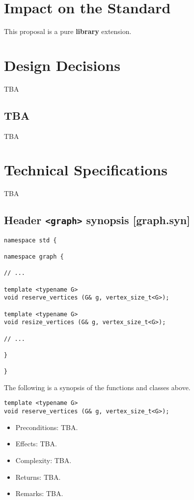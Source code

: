 \documentclass[10pt,onecolumn]{article}
\begin{document}
\section{Impact on the Standard}
This proposal is a pure \textbf{library} extension.

\section{Design Decisions}
TBA

\subsection{TBA}
TBA

\section{Technical Specifications}
TBA

\subsection{Header \texttt{<graph>} synopsis [graph.syn]}

\begin{lstlisting}
namespace std {

namespace graph {

// ...

template <typename G>
void reserve_vertices (G& g, vertex_size_t<G>);

template <typename G>
void resize_vertices (G& g, vertex_size_t<G>);

// ...

}

}
\end{lstlisting}

\vspace{10pt}

\noindent The following is a synopsis of the functions and classes above.

\begin{lstlisting}
template <typename G>
void reserve_vertices (G& g, vertex_size_t<G>);
\end{lstlisting}
%
\begin{itemize}
\item Preconditions: TBA.
\item Effects: TBA.
\item Complexity: TBA.
\item Returns: TBA.
\item Remarks: TBA.
\end{itemize}
\end{document}
